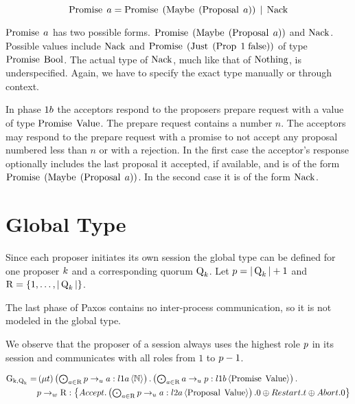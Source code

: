 \[\operatorname{Promise}\; a = \operatorname{Promise}\; \left(\operatorname{Maybe}\; \left(\operatorname{Proposal}\; a\right)\right) \; | \; \operatorname{Nack}\]

$\operatorname{Promise}\; a$ has two possible forms.
$\operatorname{Promise}\; \left(\operatorname{Maybe}\; \left(\operatorname{Proposal}\; a\right)\right)$ and $\operatorname{Nack}$.
Possible values include $\operatorname{Nack}$ and $\operatorname{Promise}\; \left(\operatorname{Just}\; \left(\operatorname{Prop}\; 1\; {\operatorname{false}}\right)\right)$ of type $\operatorname{Promise}\; \mathbb{\operatorname{Bool}}$.
The actual type of $\operatorname{Nack}$, much like that of $\operatorname{Nothing}$, is underspecified.
Again, we have to specify the exact type manually or through context.

In phase $1b$ the acceptors respond to the proposers prepare request with a value of type $\operatorname{Promise}\; \operatorname{Value}$.
The prepare request contains a number $n$.
The acceptors may respond to the prepare request with a promise to not accept any proposal numbered less than $n$ or with a rejection.
In the first case the acceptor's response optionally includes the last proposal it accepted, if available, and is of the form $\operatorname{Promise}\; \left(\operatorname{Maybe}\; \left(\operatorname{Proposal}\; a\right)\right)$.
In the second case it is of the form $\operatorname{Nack}$.

\section{Global Type}
Since each proposer initiates its own session the global type can be defined for one proposer $k$ and a corresponding quorum $\operatorname{Q}_{k}$.
Let $p = |\operatorname{Q}_{k}| + 1$ and $\operatorname{R} = \left\{1,\ldots,|\operatorname{Q}_{k}|\right\}$.

The last phase of Paxos contains no inter-process communication, so it is not modeled in the global type.

We observe that the proposer of a session always uses the highest role $p$ in its session and communicates with all roles from $1$ to $p - 1$.

\begin{align*}
    \operatorname{G_{k, \operatorname{Q}_{k}}} =&
        \left(\mu t\right)
        \textstyle\left(\bigodot_{
            a \in \operatorname{R}
        } 
            p \to_u a : l1a \left\langle \mathbb{N} \right\rangle
        \right) .
        \textstyle\left(\bigodot_{
            a \in \operatorname{R}
        } 
            a \to_u p : l1b \left\langle \operatorname{Promise}\; \operatorname{Value} \right\rangle
        \right) .\\
    &
        p \to_w \operatorname{R} : \left\{
            \mathnormal{Accept}.
                \textstyle\left(\bigodot_{
                    a \in \operatorname{R}
                } 
                    p \to_u a : l2a \left\langle \operatorname{Proposal}\; \operatorname{Value} \right\rangle
                \right).
                0
            \oplus \mathnormal{Restart}.
                t
            \oplus \mathnormal{Abort}.
                0
        \right\}
\end{align*}

